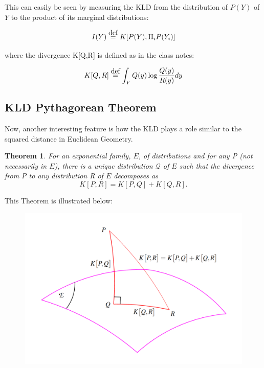 \documentclass[10pt]{article}
\newcommand\myeq{\stackrel{\normalfont\mbox{def}}{=}}
\newtheorem{theorem}{Theorem}[section]
\begin{document}
This can easily be seen by measuring the KLD from the distribution of $P(Y)$ of $Y$ to the product of its marginal distributions:

\begin{dmath}
I(Y) \myeq K[P(Y), \Pi_i P(Y_i)]
\end{dmath}

where the divergence K[Q,R] is defined as in the class notes:

\begin{dmath}
K[Q,R] \myeq \int_Y {Q(y) \log \frac{Q(y)}{R(y)}} dy
\end{dmath}



\subsection{KLD Pythagorean Theorem}

Now, another interesting feature is how the KLD plays a role similar to the squared distance in Euclidean Geometry.

\begin{theorem}
For an exponential family, $E$, of distributions and for any P (not necessarily in $E$), there is a unique distribution $\mathcal{Q}$ of $E$ such that the divergence from P to any distribution R of $E$ decomposes as
\begin{dmath}
K[P,R] = K[P,Q] + K[Q,R].
\end{dmath}
\end{theorem}

This Theorem is illustrated below:


\begin{figure}[h]
\begin{center}
\includegraphics[scale=0.50]{KLD.pdf}
\end{center}
\end{figure}
\end{document}
